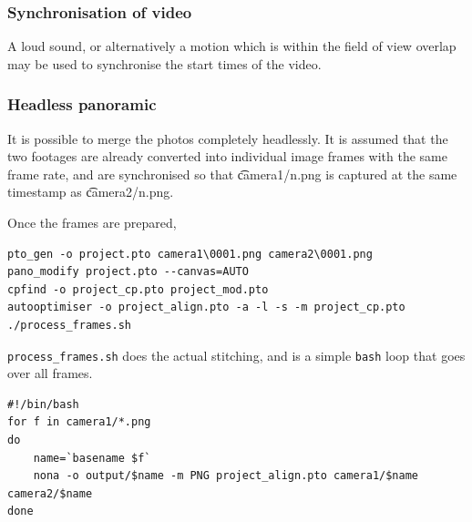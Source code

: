 \documentclass{article}
\begin{document}
\subsubsection{Synchronisation of video}

A loud sound, or alternatively a motion which is within the field of view overlap may be used to synchronise the start times of the video.

\subsubsection{Headless panoramic}

It is possible to merge the photos completely headlessly. It is assumed that the two footages are already converted into individual image frames with the same frame rate, and are synchronised so that {\t camera1/n.png} is captured at the same timestamp as {\t camera2/n.png}.

Once the frames are prepared, %

\begin{lstlisting}
pto_gen -o project.pto camera1\0001.png camera2\0001.png
pano_modify project.pto --canvas=AUTO
cpfind -o project_cp.pto project_mod.pto
autooptimiser -o project_align.pto -a -l -s -m project_cp.pto
./process_frames.sh
\end{lstlisting}

{\tt process\_frames.sh} does the actual stitching, and is a simple {\tt bash} loop that goes over all frames.

\begin{lstlisting}
#!/bin/bash
for f in camera1/*.png
do
    name=`basename $f`
    nona -o output/$name -m PNG project_align.pto camera1/$name camera2/$name
done
\end{lstlisting}
\end{document}
